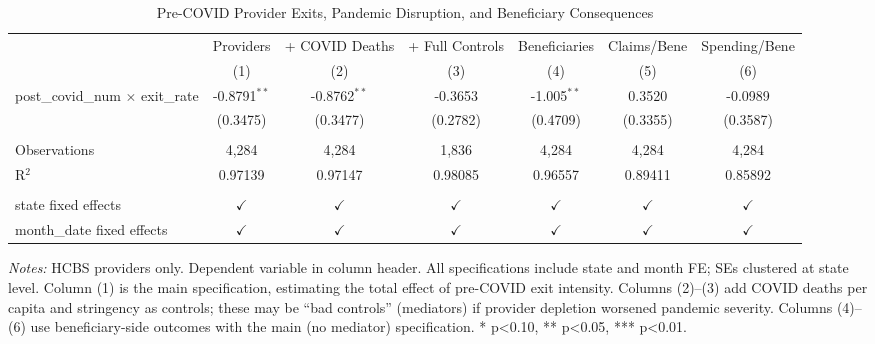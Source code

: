 
\begin{table}[htbp]
   \caption{\label{tab:main} Pre-COVID Provider Exits, Pandemic Disruption, and Beneficiary Consequences}
   \bigskip
   \centering
   \begin{tabular}{lcccccc}
      \toprule
                                               & Providers      & + COVID Deaths & + Full Controls & Beneficiaries & Claims/Bene   & Spending/Bene \\   
                                               & (1)            & (2)            & (3)             & (4)           & (5)           & (6)\\  
      \midrule 
      post\_covid\_num $\times$ exit\_rate     & -0.8791$^{**}$ & -0.8762$^{**}$ & -0.3653         & -1.005$^{**}$ & 0.3520        & -0.0989\\   
                                               & (0.3475)       & (0.3477)       & (0.2782)        & (0.4709)      & (0.3355)      & (0.3587)\\   
       \\
      Observations                             & 4,284          & 4,284          & 1,836           & 4,284         & 4,284         & 4,284\\  
      R$^2$                                    & 0.97139        & 0.97147        & 0.98085         & 0.96557       & 0.89411       & 0.85892\\  
       \\
      state fixed effects                      & $\checkmark$   & $\checkmark$   & $\checkmark$    & $\checkmark$  & $\checkmark$  & $\checkmark$\\   
      month\_date fixed effects                & $\checkmark$   & $\checkmark$   & $\checkmark$    & $\checkmark$  & $\checkmark$  & $\checkmark$\\   
      \bottomrule
   \end{tabular}
   
   \par \raggedright 
   \textit{Notes:} HCBS providers only. Dependent variable in column header. All specifications include state and month FE; SEs clustered at state level. Column (1) is the main specification, estimating the total effect of pre-COVID exit intensity. Columns (2)--(3) add COVID deaths per capita and stringency as controls; these may be ``bad controls'' (mediators) if provider depletion worsened pandemic severity. Columns (4)--(6) use beneficiary-side outcomes with the main (no mediator) specification. * p<0.10, ** p<0.05, *** p<0.01.
\end{table}


